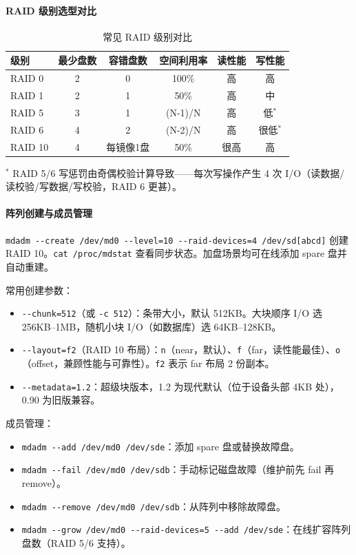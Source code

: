 \documentclass[12pt,UTF8]{ctexbook}
\begin{document}
\paragraph{RAID 级别选型对比}

\begin{table}[htbp]
	\centering
	\caption{常见 RAID 级别对比}
	\label{tab:raid-levels}
	\begin{tabular}{@{}lccccc@{}}
		\toprule
		\textbf{级别} & \textbf{最少盘数} & \textbf{容错盘数} & \textbf{空间利用率} & \textbf{读性能} & \textbf{写性能} \\
		\midrule
		RAID 0  & 2 & 0  & 100\%          & 高     & 高     \\
		RAID 1  & 2 & 1  & 50\%           & 高     & 中     \\
		RAID 5  & 3 & 1  & (N-1)/N        & 高     & 低$^*$ \\
		RAID 6  & 4 & 2  & (N-2)/N        & 高     & 很低$^*$ \\
		RAID 10 & 4 & 每镜像1盘 & 50\%     & 很高   & 高     \\
		\bottomrule
	\end{tabular}
\end{table}
$^*$ RAID 5/6 写惩罚由奇偶校验计算导致——每次写操作产生 4 次 I/O（读数据/读校验/写数据/写校验，RAID 6 更甚）。

\paragraph{阵列创建与成员管理}

\verb|mdadm --create /dev/md0 --level=10 --raid-devices=4 /dev/sd[abcd]| 创建 RAID 10。\verb|cat /proc/mdstat| 查看同步状态。加盘场景均可在线添加 spare 盘并自动重建。

常用创建参数：
\begin{itemize}
	\item \verb|--chunk=512|（或 \verb|-c 512|）：条带大小，默认 512KB。大块顺序 I/O 选 256KB--1MB，随机小块 I/O（如数据库）选 64KB--128KB。
	\item \verb|--layout=f2|（RAID 10 布局）：\verb|n|（near，默认）、\verb|f|（far，读性能最佳）、\verb|o|（offset，兼顾性能与可靠性）。\verb|f2| 表示 far 布局 2 份副本。
	\item \verb|--metadata=1.2|：超级块版本，1.2 为现代默认（位于设备头部 4KB 处），0.90 为旧版兼容。
\end{itemize}

成员管理：
\begin{itemize}
	\item \verb|mdadm --add /dev/md0 /dev/sde|：添加 spare 盘或替换故障盘。
	\item \verb|mdadm --fail /dev/md0 /dev/sdb|：手动标记磁盘故障（维护前先 fail 再 remove）。
	\item \verb|mdadm --remove /dev/md0 /dev/sdb|：从阵列中移除故障盘。
	\item \verb|mdadm --grow /dev/md0 --raid-devices=5 --add /dev/sde|：在线扩容阵列盘数（RAID 5/6 支持）。
\end{itemize}
\end{document}
